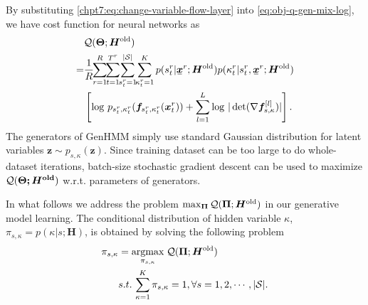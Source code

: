 By substituting \eqref{chpt7:eq:change-variable-flow-layer} into \eqref{eq:obj-q-gen-mix-log}, we have cost function for neural networks as
\begin{align}\label{eq:obj-q-gen-mix}
  &\Qq(\bm{\Theta}; \bm{H}^{\mathrm{old}}) \nonumber \\
  =& \frac{1}{R}\hspace{-3pt}\sum_{r=1}^{R}\hspace{-3pt} \sum_{t=1}^{{T}^{r}}\hspace{-3pt} \sum_{\smtr{s}{t}{r}=1}^{|\Ss|} \hspace{-3pt} \sum_{\smtr{\kappa}{t}{r}=1}^{K}p(\smtr{s}{t}{r}| \ubmr{x}{r}; \bm{H}^{\mathrm{old}})p(\smtr{\kappa}{t}{r}|\smtr{s}{t}{r}, \ubmr{x}{r}; \bm{H}^{\mathrm{old}}) \nonumber\\
  &\left[ \log\, p_{\smtr{s}{t}{r}, \smtr{\kappa}{t}{r}}(\bm{f}_{\smtr{s}{t}{r}, \smtr{\kappa}{t}{r}}(\bmtr{x}{t}{r})) + \sum_{l=1}^{L}\log\,| \det (\nabla{\bm{f}_{s,\kappa}^{[l]}})|\right].
\end{align}
The generators of GenHMM simply use standard Gaussian distribution for latent variables $\bm{z} \sim p_{s,\kappa}(\bm{z})$. Since training dataset can be too large to do whole-dataset iterations, batch-size stochastic gradient descent can be used to maximize $\mathcal{Q}(\bm{\Theta; \bm{H}^{\mathrm{old}}})$ w.r.t. parameters of generators.

In what follows we address the problem $\max_{\bm{\Pi}} \mathcal{Q}(\bm{\Pi}; \bm{H}^{\mathrm{old}})$ in our generative model learning. The conditional distribution of hidden variable $\kappa$, $\pi_{s, \kappa} = p(\kappa | s; \bm{H})$, is obtained by solving the following problem
\begin{align}\label{opm:pi}
  \pi_{s, \kappa} & = \underset{\pi_{s, \kappa}}{\operatorname{argmax}}\; \mathcal{Q}(\bm{\Pi}; \bm{H}^{\mathrm{old}}) \\ \nonumber
                  & s.t. \, \sum_{\kappa=1}^{K} \pi_{s, \kappa}= 1, \forall s = 1, 2, \cdots, |\mathcal{S}|. 
\end{align}

